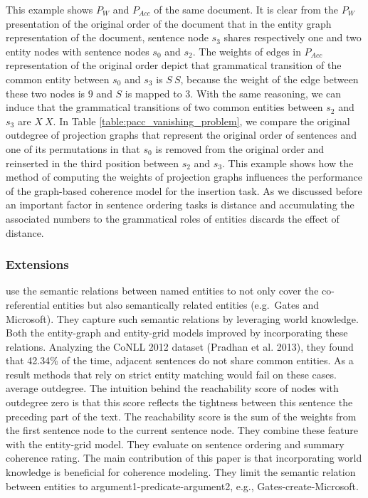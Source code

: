 This example shows $P_W$ and $P_{Acc}$ of the same document. 
It is clear from the $P_W$ presentation of the original order of the document that in the entity graph representation of the document, sentence node $s_3$ shares respectively one and two entity nodes with sentence nodes $s_0$ and $s_2$. 
The weights of edges in $P_{Acc}$ representation of the original order depict that grammatical transition of the common entity between $s_0$ and $s_3$ is $S\ S$, because the weight of the edge between these two nodes is $9$ and $S$ is mapped to $3$. 
With the same reasoning, we can induce that the grammatical transitions of two common entities between $s_2$ and $s_3$ are $X\ X$. 
In Table \ref{table:pacc_vanishing_problem}, we compare the original outdegree of projection graphs that represent the original order of sentences and one of its permutations in that $s_0$ is removed from the original order and reinserted in the third position between $s_2$ and $s_3$. 
This example shows how the method of computing the weights of projection graphs influences the performance of the graph-based coherence model for the insertion task. 
As we discussed before an important factor in sentence ordering tasks is distance and 
 accumulating the associated numbers to the grammatical roles of entities discards the effect of distance. 



\subsubsection{Extensions}

 use the semantic relations between named entities to not only cover the co-referential entities but also semantically related entities (e.g.\ Gates and Microsoft). 
They capture such semantic relations by leveraging world knowledge.
Both the \mbox{entity-graph} and \mbox{entity-grid} models improved by incorporating these relations. 
Analyzing the CoNLL 2012 dataset (Pradhan et al. 2013), they found that 42.34\% of the time, adjacent sentences do not share common entities. 
As a result methods that rely on strict entity matching would fail on these cases. 
average outdegree. 
The intuition behind the reachability score of nodes with outdegree zero is that this score reflects the tightness between this sentence the preceding part of the text. 
The reachability score is the sum of the weights from the first sentence node to the current sentence node. 
They combine these feature with the \mbox{entity-grid} model. 
They evaluate on sentence ordering and summary coherence rating. 
The main contribution of this paper is that incorporating world knowledge is beneficial for coherence modeling. 
They limit the semantic relation between entities to argument1-predicate-argument2, e.g., Gates-create-Microsoft.

